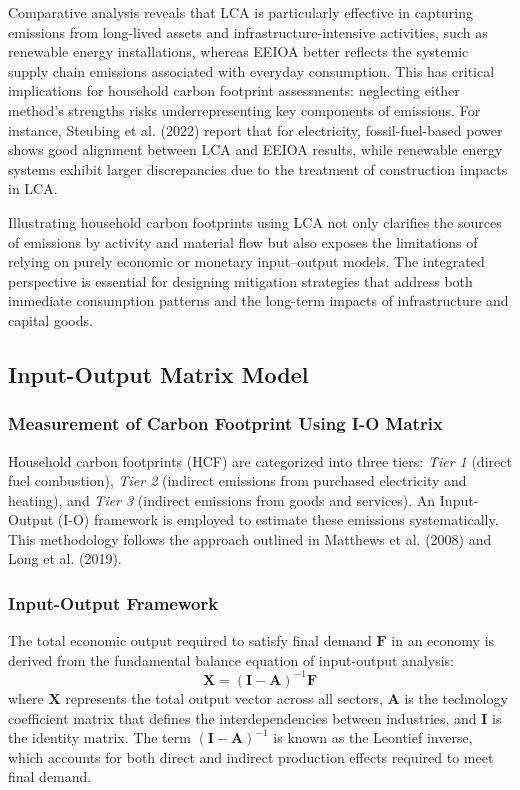 \documentclass[12pt,a4paper]{article}%
\begin{document}
Comparative analysis reveals that LCA is particularly effective in capturing emissions from long-lived assets and infrastructure-intensive activities, such as renewable energy installations, whereas EEIOA better reflects the systemic supply chain emissions associated with everyday consumption. This has critical implications for household carbon footprint assessments: neglecting either method's strengths risks underrepresenting key components of emissions. For instance, Steubing et al. (2022) report that for electricity, fossil-fuel-based power shows good alignment between LCA and EEIOA results, while renewable energy systems exhibit larger discrepancies due to the treatment of construction impacts in LCA.

Illustrating household carbon footprints using LCA not only clarifies the sources of emissions by activity and material flow but also exposes the limitations of relying on purely economic or monetary input--output models. The integrated perspective is essential for designing mitigation strategies that address both immediate consumption patterns and the long-term impacts of infrastructure and capital goods.

\subsection{Input-Output Matrix Model}

\subsubsection*{Measurement of Carbon Footprint Using I-O Matrix}

Household carbon footprints (HCF) are categorized into three tiers: \textit{Tier 1} (direct fuel combustion), \textit{Tier 2} (indirect emissions from purchased electricity and heating), and \textit{Tier 3} (indirect emissions from goods and services). An Input-Output (I-O) framework is employed to estimate these emissions systematically. This methodology follows the approach outlined in Matthews et al. (2008) and Long et al. (2019).

\subsubsection*{Input-Output Framework}
The total economic output required to satisfy final demand \( \mathbf{F} \) in an economy is derived from the fundamental balance equation of input-output analysis:
\begin{equation}
    \mathbf{X} = (\mathbf{I} - \mathbf{A})^{-1} \mathbf{F}
\end{equation}
where \( \mathbf{X} \) represents the total output vector across all sectors, \( \mathbf{A} \) is the technology coefficient matrix that defines the interdependencies between industries, and \( \mathbf{I} \) is the identity matrix. The term \( (\mathbf{I} - \mathbf{A})^{-1} \) is known as the Leontief inverse, which accounts for both direct and indirect production effects required to meet final demand.
\end{document}
